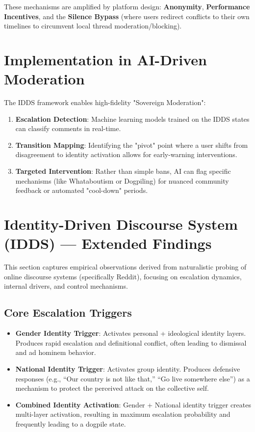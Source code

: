 \documentclass[11pt,a4paper]{article}
\begin{document}
These mechanisms are amplified by platform design: \textbf{Anonymity}, \textbf{Performance Incentives}, and the \textbf{Silence Bypass} (where users redirect conflicts to their own timelines to circumvent local thread moderation/blocking).

\section{Implementation in AI-Driven Moderation}
The IDDS framework enables high-fidelity "Sovereign Moderation":
\begin{enumerate}
    \item \textbf{Escalation Detection}: Machine learning models trained on the IDDS states can classify comments in real-time.
    \item \textbf{Transition Mapping}: Identifying the "pivot" point where a user shifts from disagreement to identity activation allows for early-warning interventions.
    \item \textbf{Targeted Intervention}: Rather than simple bans, AI can flag specific mechanisms (like Whataboutism or Dogpiling) for nuanced community feedback or automated "cool-down" periods.
\end{enumerate}
\section{Identity-Driven Discourse System (IDDS) --- Extended Findings}
This section captures empirical observations derived from naturalistic probing of online discourse systems (specifically Reddit), focusing on escalation dynamics, internal drivers, and control mechanisms.

\subsection{Core Escalation Triggers}
\begin{itemize}
    \item \textbf{Gender Identity Trigger}: Activates personal + ideological identity layers. Produces rapid escalation and definitional conflict, often leading to dismissal and ad hominem behavior.
    \item \textbf{National Identity Trigger}: Activates group identity. Produces defensive responses (e.g., “Our country is not like that,” “Go live somewhere else”) as a mechanism to protect the perceived attack on the collective self.
    \item \textbf{Combined Identity Activation}: Gender + National identity trigger creates multi-layer activation, resulting in maximum escalation probability and frequently leading to a dogpile state.
\end{itemize}
\end{document}
